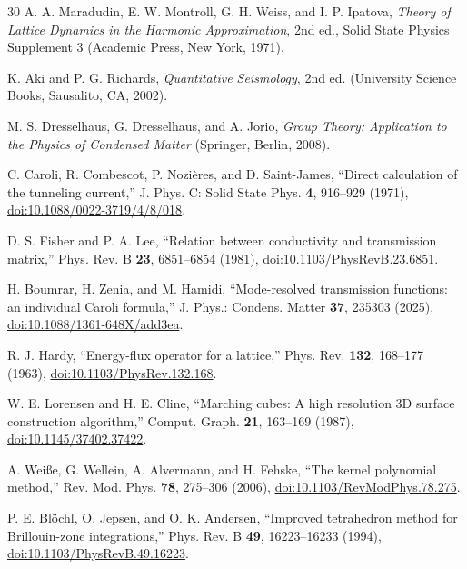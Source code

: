 \documentclass[10pt,aps,pre,reprint,floatfix,notitlepage,nofootinbib]{revtex4-2}
\begin{document}
\begin{thebibliography}{30}
A. A. Maradudin, E. W. Montroll, G. H. Weiss, and I. P. Ipatova,
\textit{Theory of Lattice Dynamics in the Harmonic Approximation},
2nd ed., Solid State Physics Supplement 3
(Academic Press, New York, 1971).

K. Aki and P. G. Richards,
\textit{Quantitative Seismology}, 2nd ed.
(University Science Books, Sausalito, CA, 2002).

M. S. Dresselhaus, G. Dresselhaus, and A. Jorio,
\textit{Group Theory: Application to the Physics of Condensed Matter}
(Springer, Berlin, 2008).

C. Caroli, R. Combescot, P. Nozi\`eres, and D. Saint-James,
``Direct calculation of the tunneling current,''
J. Phys. C: Solid State Phys. \textbf{4}, 916--929 (1971),
\href{https://doi.org/10.1088/0022-3719/4/8/018}{doi:10.1088/0022-3719/4/8/018}.

D. S. Fisher and P. A. Lee,
``Relation between conductivity and transmission matrix,''
Phys. Rev. B \textbf{23}, 6851--6854 (1981),
\href{https://doi.org/10.1103/PhysRevB.23.6851}{doi:10.1103/PhysRevB.23.6851}.

H. Boumrar, H. Zenia, and M. Hamidi,
``Mode-resolved transmission functions: an individual Caroli formula,''
J. Phys.: Condens. Matter \textbf{37}, 235303 (2025),
\href{https://doi.org/10.1088/1361-648X/add3ea}{doi:10.1088/1361-648X/add3ea}.

R. J. Hardy,
``Energy-flux operator for a lattice,''
Phys. Rev. \textbf{132}, 168--177 (1963),
\href{https://doi.org/10.1103/PhysRev.132.168}{doi:10.1103/PhysRev.132.168}.

W. E. Lorensen and H. E. Cline,
``Marching cubes: A high resolution 3D surface construction algorithm,''
Comput. Graph. \textbf{21}, 163--169 (1987),
\href{https://doi.org/10.1145/37402.37422}{doi:10.1145/37402.37422}.

A. Wei\ss{}e, G. Wellein, A. Alvermann, and H. Fehske,
``The kernel polynomial method,''
Rev. Mod. Phys. \textbf{78}, 275--306 (2006),
\href{https://doi.org/10.1103/RevModPhys.78.275}{doi:10.1103/RevModPhys.78.275}.

P. E. Bl\"ochl, O. Jepsen, and O. K. Andersen,
``Improved tetrahedron method for Brillouin-zone integrations,''
Phys. Rev. B \textbf{49}, 16223--16233 (1994),
\href{https://doi.org/10.1103/PhysRevB.49.16223}{doi:10.1103/PhysRevB.49.16223}.


\end{thebibliography}
\end{document}
